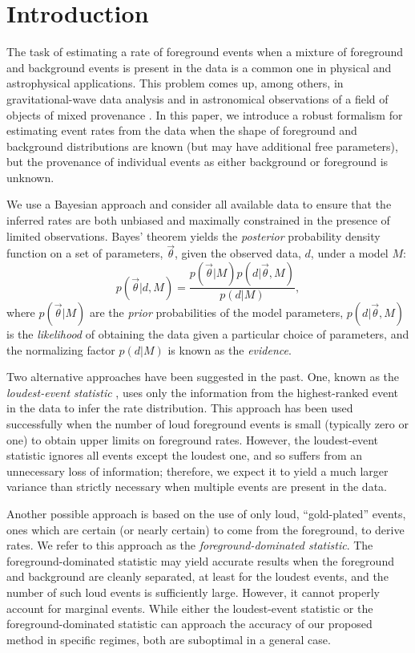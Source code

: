 \documentclass[aps,prd]{revtex4-1}
\begin{document}
\section{Introduction}

The task of estimating a rate of foreground events when a mixture of
foreground and background events is present in the data is a common
one in physical and astrophysical applications.  This problem comes
up, among others, in gravitational-wave data analysis
\cite[e.g.,][]{s5-highmass,s6-lowmass} and in astronomical
observations of a field of objects of mixed provenance
\cite{DeGennaro2009}.  In this paper, we introduce a robust formalism
for estimating event rates from the data when the shape of foreground
and background distributions are known (but may have additional free
parameters), but the provenance of individual events as either
background or foreground is unknown.

We use a Bayesian approach and consider all available data to ensure
that the inferred rates are both unbiased and maximally constrained in
the presence of limited observations.  Bayes' theorem yields the
\emph{posterior} probability density function on a set of parameters,
$\vec{\theta}$, given the observed data, $d$, under a model $M$:
\begin{equation}
p(\vec{\theta} | d, M) = \frac{p(\vec{\theta}|M)
  p(d|\vec{\theta},M)}{p(d|M)},
\end{equation}
where $p(\vec{\theta}|M)$ are the \emph{prior} probabilities of the
model parameters, $p(d|\vec{\theta},M)$ is the \emph{likelihood} of
obtaining the data given a particular choice of parameters, and the
normalizing factor $p(d|M)$ is known as the \emph{evidence}.

Two alternative approaches have been suggested in the past.  One,
known as the \emph{loudest-event statistic} \cite{Biswas2009}, uses
only the information from the highest-ranked event in the data to
infer the rate distribution.  This approach has been used successfully
\cite{s5-highmass,s6-lowmass} when the number of loud foreground
events is small (typically zero or one) to obtain upper limits on
foreground rates.  However, the loudest-event statistic ignores all
events except the loudest one, and so suffers from an unnecessary loss
of information; therefore, we expect it to yield a much larger
variance than strictly necessary when multiple events are present in
the data.

Another possible approach is based on the use of only loud,
``gold-plated'' events, ones which are certain (or nearly certain) to
come from the foreground, to derive rates.  We refer to this approach
as the \emph{foreground-dominated statistic}.  The
foreground-dominated statistic may yield accurate results when the
foreground and background are cleanly separated, at least for the
loudest events, and the number of such loud events is sufficiently
large.  However, it cannot properly account for marginal events.
While either the loudest-event statistic or the foreground-dominated
statistic can approach the accuracy of our proposed method in specific
regimes, both are suboptimal in a general case.
\end{document}
